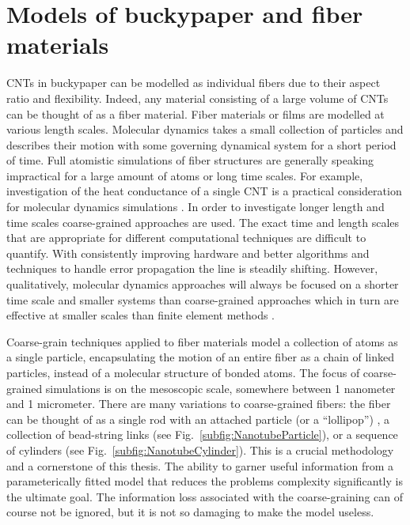 \section{Models of buckypaper and fiber materials}

	CNTs in buckypaper can be modelled as individual fibers due to their aspect ratio and flexibility. Indeed, any material consisting of a large volume of CNTs can be thought of as a fiber material. Fiber materials or films are modelled at various length scales. Molecular dynamics takes a small collection of particles and describes their motion with some governing dynamical system for a short period of time. Full atomistic simulations of fiber structures are generally speaking impractical for a large amount of atoms or long time scales. For example, investigation of the heat conductance of a single CNT is a practical consideration for molecular dynamics simulations \cite{Maruyama2003}. In order to investigate longer length and time scales coarse-grained approaches are used. The exact time and length scales that are appropriate for different computational techniques are difficult to quantify. With consistently improving hardware and better algorithms and techniques to handle error propagation the line is steadily shifting. However, qualitatively, molecular dynamics approaches will always be focused on a shorter time scale and smaller systems than coarse-grained approaches which in turn are effective at smaller scales than finite element methods \cite{Muller2002}.
	
	Coarse-grain techniques applied to fiber materials model a collection of atoms as a single particle, encapsulating the motion of an entire fiber as a chain of linked particles, instead of a molecular structure of bonded atoms. The focus of coarse-grained simulations is on the mesoscopic scale, somewhere between 1 nanometer and 1 micrometer.  There are many variations to coarse-grained fibers: the fiber can be thought of as a single rod with an attached particle (or a ``lollipop'') \cite{Buehler2006}, a collection of bead-string links \cite{Li2012} (see Fig.~\ref{subfig:NanotubeParticle}), or a sequence of cylinders \cite{Volkov2008} (see Fig.~\ref{subfig:NanotubeCylinder}). This is a crucial methodology and a cornerstone of this thesis. The ability to garner useful information from a parameterically fitted model that reduces the problems complexity significantly is the ultimate goal. The information loss associated with the coarse-graining can of course not be ignored, but it is not so damaging to make the model useless.
	
